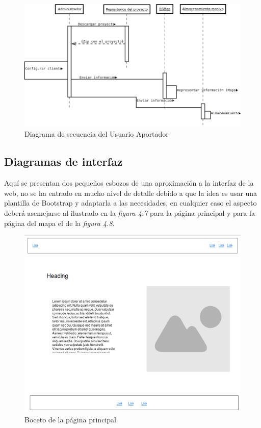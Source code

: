 \newpage

\begin{figure}[!h]
  \begin{center}
  \includegraphics[scale=0.45]{../images/diag_plan/seq_user_ap.png}
  \caption{Diagrama de secuencia del Usuario Aportador}
  \label{fig:ar_rsmap}
  \end{center}
\end{figure}

\newpage

\subsection{Diagramas de interfaz}

Aquí se presentan dos pequeños esbozos de una aproximación a la interfaz de la web, no se ha entrado en mucho nivel de detalle debido a que la idea es usar una plantilla de Bootstrap y adaptarla a las necesidades, en cualquier caso el aspecto deberá asemejarse al ilustrado en la \textit{figura 4.7} para la página principal y para la página del mapa el de la \textit{figura 4.8}.

\begin{figure}[!ht]
  \begin{center}
  \includegraphics[scale=0.6]{../images/diag_plan/ui_general.png}
  \caption{Boceto de la página principal}
  \label{fig:ar_rsmap}
  \end{center}
\end{figure}

